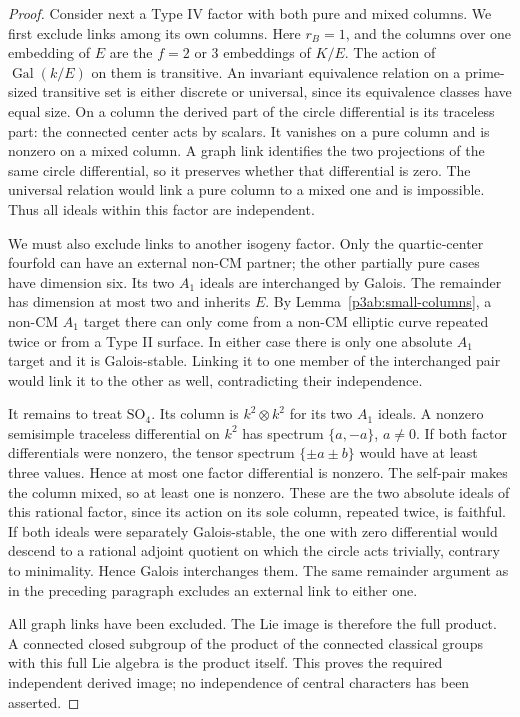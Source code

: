 \documentclass[11pt]{article}
\numberwithin{equation}{section}
\begin{document}
\begin{proof}
Consider next a Type IV factor with both pure and mixed columns.
We first exclude links among its own columns.
Here \(r_B=1\), and the columns over one embedding of \(E\)
are the \(f=2\) or \(3\) embeddings of \(K/E\).  The action
of \(\operatorname{Gal}(k/E)\) on them is transitive.  An
invariant equivalence relation on a prime-sized transitive set is
either discrete or universal, since its equivalence classes have
equal size.  On a column the derived part of the circle
differential is its traceless part: the connected center acts
by scalars.  It vanishes on a pure column and is nonzero on a
mixed column.  A graph link identifies the two projections of the
same circle differential, so it preserves whether that differential
is zero.  The universal relation would link a pure column to a
mixed one and is impossible.  Thus all ideals within this factor
are independent.

We must also exclude links to another isogeny factor.  Only the
quartic-center fourfold can have an external non-CM
partner; the other partially pure cases have dimension six.  Its
two \(A_1\) ideals are interchanged by Galois.  The remainder
has dimension at most two and inherits \(E\).  By
Lemma~\ref{p3ab:small-columns}, a non-CM \(A_1\) target there
can only come from a non-CM elliptic curve repeated twice or
from a Type II surface.  In either case there is only one
absolute \(A_1\) target and it is Galois-stable.  Linking it to
one member of the interchanged pair would link it to the other
as well, contradicting their independence.

It remains to treat \(\mathrm{SO}_4\).  Its column is
\(k^2\otimes k^2\) for its two \(A_1\) ideals.  A nonzero
semisimple traceless differential on \(k^2\) has spectrum
\(\{a,-a\}\), \(a\ne0\).  If both factor differentials were
nonzero, the tensor spectrum \(\{\pm a\pm b\}\) would have at
least three values.  Hence at most one factor differential is
nonzero.  The self-pair makes the column mixed, so at least one is
nonzero.  These are the two absolute ideals
of this rational factor, since its action on its sole column,
repeated twice, is faithful.  If both ideals were separately
Galois-stable, the one with zero differential would descend to a rational
adjoint quotient on which the circle acts trivially, contrary to
minimality.  Hence Galois interchanges them.  The same remainder
argument as in the preceding paragraph excludes an external link
to either one.

All graph links have been excluded.  The Lie image is therefore
the full product.  A connected closed subgroup of the product
of the connected classical groups with this full Lie algebra is
the product itself.  This proves the required independent
derived image; no independence of central characters has been
asserted.
\end{proof}
\end{document}
